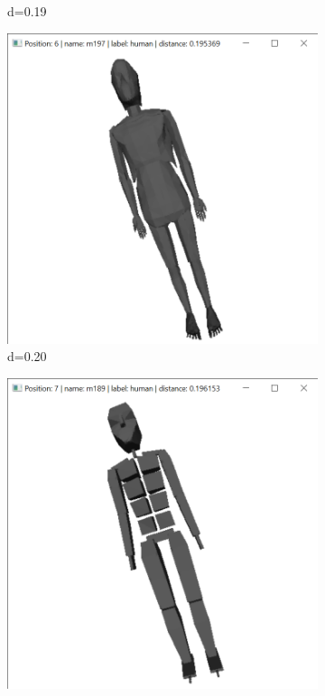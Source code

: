 \documentclass{bigdata}
\begin{document}
\begin{figure}[h!]
\begin{subfigure}[b]{0.09\linewidth}
    \caption*{d=0.19}
  \end{subfigure}
  \begin{subfigure}[b]{0.09\linewidth}
    \includegraphics[width=\linewidth]{Pictures/Evaluation/m134/pos6.png}
    \caption*{d=0.20}
  \end{subfigure}
  \begin{subfigure}[b]{0.09\linewidth}
    \includegraphics[width=\linewidth]{Pictures/Evaluation/m134/pos7.png}

\end{subfigure}
\end{figure}
\end{document}
